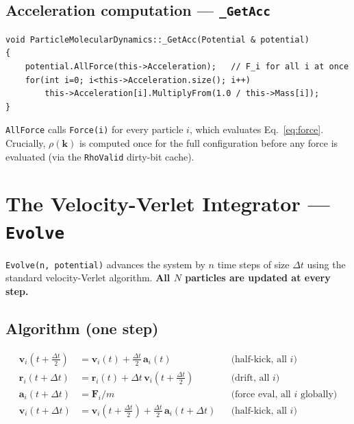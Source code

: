 \documentclass[12pt,a4paper]{article}
\begin{document}
\subsection{Acceleration computation --- \texttt{\_GetAcc}}

\begin{lstlisting}
void ParticleMolecularDynamics::_GetAcc(Potential & potential)
{
    potential.AllForce(this->Acceleration);   // F_i for all i at once
    for(int i=0; i<this->Acceleration.size(); i++)
        this->Acceleration[i].MultiplyFrom(1.0 / this->Mass[i]);
}
\end{lstlisting}

\texttt{AllForce} calls \texttt{Force(i)} for every particle $i$, which
evaluates Eq.~\eqref{eq:force}. Crucially, $\rho(\mathbf{k})$ is computed
once for the full configuration before any force is evaluated (via the
\texttt{RhoValid} dirty-bit cache).

\section{The Velocity-Verlet Integrator --- \texttt{Evolve}}

\texttt{Evolve(n, potential)} advances the system by $n$ time steps of
size $\Delta t$ using the standard velocity-Verlet algorithm.
\textbf{All $N$ particles are updated at every step.}

\subsection{Algorithm (one step)}

\begin{align}
    \mathbf{v}_i\!\left(t + \tfrac{\Delta t}{2}\right)
        &= \mathbf{v}_i(t) + \tfrac{\Delta t}{2}\,\mathbf{a}_i(t)
        && \text{(half-kick, all } i\text{)}
    \\
    \mathbf{r}_i(t + \Delta t)
        &= \mathbf{r}_i(t) + \Delta t\,\mathbf{v}_i\!\left(t + \tfrac{\Delta t}{2}\right)
        && \text{(drift, all } i\text{)}
    \\
    \mathbf{a}_i(t + \Delta t)
        &= \mathbf{F}_i / m
        && \text{(force eval, all } i \text{ globally)}
    \\
    \mathbf{v}_i(t + \Delta t)
        &= \mathbf{v}_i\!\left(t + \tfrac{\Delta t}{2}\right)
           + \tfrac{\Delta t}{2}\,\mathbf{a}_i(t+\Delta t)
        && \text{(half-kick, all } i\text{)}
\end{align}
\end{document}
